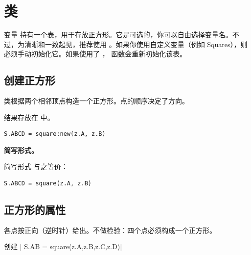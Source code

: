 \newpage
\section{ 类}
变量  持有一个表，用于存放正方形。它是可选的，你可以自由选择变量名。不过，为清晰和一致起见，推荐使用 。如果你使用自定义变量（例如 Squares），则必须手动初始化它。如果使用了 ， 函数会重新初始化该表。


\subsection{创建正方形}
\label{sub:creating_a_square}

 类根据两个相邻顶点构造一个正方形。点的顺序决定了方向。


\medskip
结果存放在  中。

\begin{mybox}
\begin{verbatim}
S.ABCD = square:new(z.A, z.B)
\end{verbatim}
\end{mybox}

\textbf{简写形式。}

简写形式  与之等价：

\begin{mybox}
\begin{verbatim}
S.ABCD = square(z.A, z.B)
\end{verbatim}
\end{mybox}

\subsection{正方形的属性}
\label{sub:square_attributes}
各点按正向（逆时针）给出。不做检验：四个点必须构成一个正方形。
\begin{mybox}
创建 | S.AB = square(z.A,z.B,z.C,z.D)|
\end{mybox}


